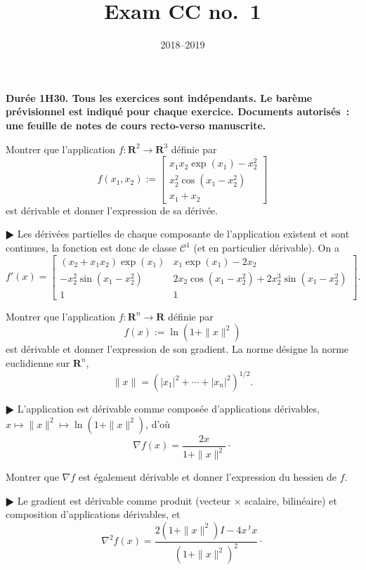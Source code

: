 \documentclass[11pt,a4paper]{article}
\title{Exam CC no.~1}
\date{2018--2019}
\def\R{\mathbf{R}}
\def\CC{\mathscr{C}}
\theoremstyle{plain}
\theoremstyle{definition}
\begin{document}
\maketitle

{\bf Dur\'ee 1H30. Tous les exercices sont ind\'ependants.
Le bar\`eme pr\'e\-vi\-sion\-nel est indiqu\'e pour chaque exercice.
Documents autoris\'es~: une feuille de notes de cours recto-verso manuscrite.}

\begin{Exercice}[3 points]
Montrer que l'application $f : \R^2 \to \R^3$ d\'efinie par
\[ f(x_1,x_2) := \left[ \begin{array}{c}
  x_1x_2\exp(x_1)-x_2^2\\
  x_2^2\cos(x_1-x_2^2)\\
  x_1+x_2
 \end{array} \right] \]
est d\'erivable et donner l'expression de sa d\'eriv\'ee.\\

\begin{corr} $\RHD$ Les d\'eriv\'ees partielles de chaque composante de l'application
existent et sont continues, la fonction est donc de classe $\CC^1$ (et en particulier
d\'erivable). On a
\[ f'(x) =
  \left[ \begin{array}{ccc}
  (x_2+x_1x_2)\exp(x_1) & x_1\exp(x_1)-2x_2\\  
  -x_2^2\sin(x_1-x_2^2) & 2x_2\cos(x_1-x_2^2)+2x_2^3\sin(x_1-x_2^2)\\ 
  1 & 1
  \end{array} \right]. \]
\end{corr}
\end{Exercice}

\begin{Exercice}[4 points]
\begin{Question}
Montrer que l'application $f : \R^n \to \R$ d\'efinie par
\[ f(x) := \ln(1+\|x\|^2) \]
est d\'erivable et donner l'expression de son gradient. La norme d\'esigne la norme
euclidienne sur $\R^n$,
\[ \|x\|=(|x_1|^2+\cdots+|x_n|^2)^{1/2}. \]
\end{Question}

\begin{corr} $\RHD$ L'application est d\'erivable comme compos\'ee d'applications
d\'erivables, $x \mapsto \|x\|^2 \mapsto \ln(1+\|x\|^2)$, d'o\`u
\[ \nabla f(x) = \frac{2x}{1+\|x\|^2}\cdot \]
\end{corr}

\begin{Question} Montrer que $\nabla f$ est \'egalement d\'erivable et donner
l'expression du hessien de $f$.
\end{Question}

\begin{corr} $\RHD$
Le gradient est d\'erivable comme produit (vecteur $\times$ scalaire,
bilin\'eaire) et composition d'applications d\'erivables, et
\[ \nabla^2 f(x) = \frac{2(1+\|x\|^2)I-4x\,^t x}{(1+\|x\|^2)^2} \cdot \]
\end{corr}
\end{Exercice}
\end{document}
